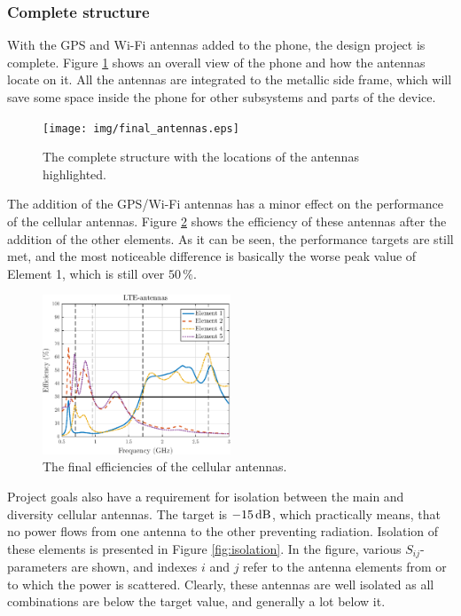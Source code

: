 \subsubsection{Complete structure}
\label{sec:complete_structure}
With the GPS and Wi-Fi antennas added to the phone, the design project is complete. Figure \ref{fig:complete_struct} shows an overall view of the phone and how the antennas locate on it. All the antennas are integrated to the metallic side frame, which will save some space inside the phone for other subsystems and parts of the device.

\begin{figure}[H]
    \centering
    \texttt{[image: img/final\_antennas.eps]}
    \caption{The complete structure with the locations of the antennas highlighted.}
    \label{fig:complete_struct}
\end{figure}

The addition of the GPS/Wi-Fi antennas has a minor effect on the performance of the cellular antennas. Figure \ref{fig:cellular_final_eff} shows the efficiency of these antennas after the addition of the other elements. As it can be seen, the performance targets are still met, and the most noticeable difference is basically the worse peak value of Element 1, which is still over $50\,\%$.
\begin{figure}[H]
    \centering
    \includegraphics[width=0.5\textwidth]{img/diversity_eff_wgps.eps}
    \caption{The final efficiencies of the cellular antennas.}
    \label{fig:cellular_final_eff}
\end{figure}

Project goals also have a requirement for isolation between the main and diversity cellular antennas. The target is $-15\,\mathrm{dB}$, which practically means, that no power flows from one antenna to the other preventing radiation. Isolation of these elements is presented in Figure \ref{fig:isolation}. In the figure, various $S_{ij}$-parameters are shown, and indexes $i$ and $j$ refer to the antenna elements from or to which the power is scattered. Clearly, these antennas are well isolated as all combinations are below the target value, and generally a lot below it.

